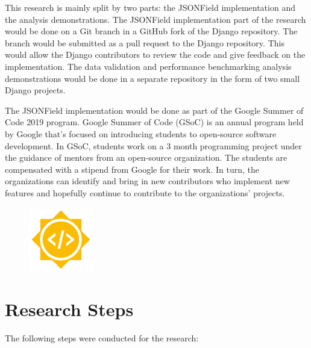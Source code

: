 This research is mainly split by two parts: the JSONField implementation and
the analysis demonstrations. The JSONField implementation part of the research
would be done on a Git branch in a GitHub fork of the Django repository. The
branch would be submitted as a pull request to the Django repository. This
would allow the Django contributors to review the code and give feedback on the
implementation. The data validation and performance benchmarking analysis
demonstrations would be done in a separate repository in the form of two small
Django projects.


The JSONField implementation would be done as part of the Google Summer of Code
2019 program. Google Summer of Code (GSoC) is an annual program held by Google
that's focused on introducing students to open-source software development. In
GSoC, students work on a 3 month programming project under the guidance of
mentors from an open-source organization. The students are compensated with a
stipend from Google for their work. In turn, the organizations can identify and
bring in new contributors who implement new features and hopefully continue to
contribute to the organizations' projects.

\begin{figure}
	\centering
    \includegraphics[width=0.25\textwidth]{pics/GSoC.png}
	\label{fig:gsoc}
\end{figure}

\section{Research Steps}

The following steps were conducted for the research:

